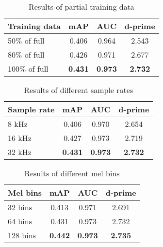 \documentclass[journal]{IEEEtran}
\newcommand{\qk}[1] {{\color{black} #1}}
\begin{document}
\qk{
\begin{table}[t]
\centering
\caption{Results of partial training data}
\label{table:partial}
\begin{tabular}{lccc}
 \toprule
 Training data & mAP & AUC & d-prime \\
 \midrule
 50\% of full & 0.406 & 0.964 & 2.543 \\
 80\% of full & 0.426 & 0.971 & 2.677 \\
 100\% of full & \textbf{0.431} & \textbf{0.973} & \textbf{2.732} \\
 \bottomrule
\end{tabular}
\end{table}

\begin{table}[t]
\centering
\caption{Results of different sample rates}
\label{table:sample_rate}
\begin{tabular}{lccc}
 \toprule
 Sample rate & mAP & AUC & d-prime \\
 \midrule
 8 kHz & 0.406 & 0.970 & 2.654 \\
 16 kHz & 0.427 & 0.973 & 2.719 \\
 32 kHz & \textbf{0.431} & \textbf{0.973} & \textbf{2.732} \\
 \bottomrule
\end{tabular}
\end{table}

\begin{table}[t]
\centering
\caption{Results of different mel bins}
\label{table:mel_bins}
\begin{tabular}{lccc}
 \toprule
 Mel bins & mAP & AUC & d-prime \\
 \midrule
 32 bins & 0.413 & 0.971 & 2.691 \\
 64 bins & 0.431 & 0.973 & 2.732 \\
 128 bins & \textbf{0.442} & \textbf{0.973} & \textbf{2.735} \\
 \bottomrule
\end{tabular}
\end{table}
}
\end{document}
